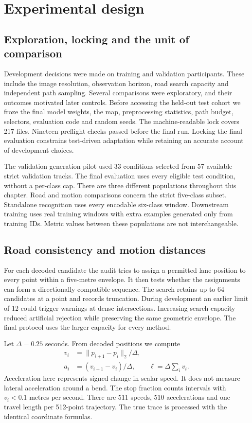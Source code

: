 \chapter{Experimental design}
\label{ch:protocol}
\section{Exploration, locking and the unit of comparison}
Development decisions were made on training and validation participants. These include the image resolution, observation horizon, road search capacity and independent path sampling. Several comparisons were exploratory, and their outcomes motivated later controls. Before accessing the held-out test cohort we froze the final model weights, the map, preprocessing statistics, path budget, selectors, evaluation code and random seeds. The machine-readable lock covers 217 files. Nineteen preflight checks passed before the final run. Locking the final evaluation constrains test-driven adaptation while retaining an accurate account of development choices.

The validation generation pilot used 33 conditions selected from 57 available strict validation tracks. The final evaluation uses every eligible test condition, without a per-class cap. There are three different populations throughout this chapter. Road and motion comparisons concern the strict five-class subset. Standalone recognition uses every encodable six-class window. Downstream training uses real training windows with extra examples generated only from training IDs. Metric values between these populations are not interchangeable.

\section{Road consistency and motion distances}
For each decoded candidate the audit tries to assign a permitted lane position to every point within a five-metre envelope. It then tests whether the assignments can form a directionally compatible sequence. The search retains up to 64 candidates at a point and records truncation. During development an earlier limit of 12 could trigger warnings at dense intersections. Increasing search capacity reduced artificial rejection while preserving the same geometric envelope. The final protocol uses the larger capacity for every method.

Let $\Delta=0.25$ seconds. From decoded positions we compute
\begin{align}
 v_i &= \|p_{i+1}-p_i\|_2/\Delta,\\
 a_i &= (v_{i+1}-v_i)/\Delta,\qquad
 \ell =\Delta\textstyle\sum_i v_i.
\end{align}
Acceleration here represents signed change in scalar speed. It does not measure lateral acceleration around a bend. The stop fraction counts intervals with $v_i<0.1$ metres per second. There are 511 speeds, 510 accelerations and one travel length per 512-point trajectory. The true trace is processed with the identical coordinate formulas.

